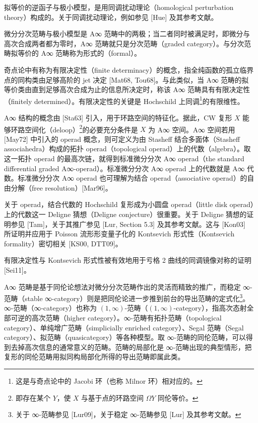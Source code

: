 拟等价的逆函子与极小模型，是用同调扰动理论（homological perturbation theory）构成的。关于同调扰动理论，例如参见 [Hue] 及其参考文献。

微分分次范畴与极小模型是 A∞ 范畴中的两极；当二者同时被满足时，即微分与高次合成两者都为零时，A∞ 范畴就只是分次范畴（graded category）。与分次范畴拟等价的 A∞ 范畴称为形式的（formal）。

奇点论中有称为有限决定性（finite determinacy）的概念，指全纯函数的孤立临界点的同构类由足够高阶的 jet 决定 [Mat68, Tou68]。与此类似，当 A∞ 范畴的拟等价类由直到足够高次合成为止的信息所决定时，称该 A∞ 范畴具有有限决定性（finitely determined）。有限决定性的关键是 Hochschild 上同调\footnote{这是与奇点论中的 Jacobi 环（也称 Milnor 环）相对应的。}的有限维性。

A∞ 结构的概念由 [Sta63] 引入，用于环路空间的特征化。据此，CW 复形 $X$ 能够环路空间化（deloop）\footnote{即存在某个 $Y$，使 $X$ 与基于点的环路空间 $\Omega Y$ 同伦等价。}的必要充分条件是 $X$ 为 A∞ 空间。A∞ 空间若用 [May72] 中引入的 operad 概念，则可定义为由 Stasheff 结合多面体（Stasheff associahedra）构成的拓扑 operad（topological operad）上的代数（algebra）。取这一拓扑 operad 的最高次链，就得到标准微分分次 A∞ operad（the standard differential graded A∞-operad）。标准微分分次 A∞ operad 上的代数就是 A∞ 代数。标准微分分次 A∞ operad 也可理解为结合 operad（associative operad）的自由分解（free resolution）[Mar96]。

关于 operad，结合代数的 Hochschild 复形成为小圆盘 operad（little disk operad）上的代数这一 Deligne 猜想（Deligne conjecture）很重要。关于 Deligne 猜想的证明参见 [Tam]，关于其推广参见 [Lur, Section 5.3] 及其参考文献。这与 [Kon03] 所证明并应用于 Poisson 流形形变量子化的 Kontsevich 形式性（Kontsevich formality）密切相关 [KS00, DTT09]。

有限决定性与 Kontsevich 形式性被有效地用于亏格 2 曲线的同调镜像对称的证明 [Sei11]。

A∞ 范畴是基于同伦论想法对微分分次范畴作出的灵活而精致的推广，而稳定 ∞-范畴（stable ∞-category）则是把同伦论进一步推到前台的导出范畴的定式化\footnote{关于 ∞-范畴参见 [Lur09]，关于稳定 ∞-范畴参见 [Lur] 及其参考文献。}。∞-范畴（∞-category）也称为 $(1,\infty)$-范畴（$(1,\infty)$-category），指高次态射全部可逆的高次范畴（higher category）。∞-范畴有拓扑范畴（topological category）、单纯增广范畴（simplicially enriched category）、Segal 范畴（Segal category）、拟范畴（quasicategory）等各种模型。取 ∞-范畴的同伦范畴，可以得到去掉高次信息的通常意义的范畴。范畴的局部化是 ∞-范畴出现的典型情形，把复形的同伦范畴用拟同构局部化所得的导出范畴即属此类。

